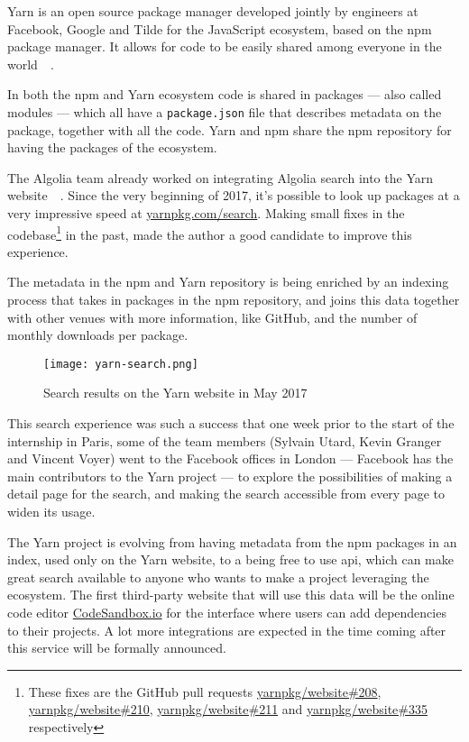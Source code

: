 Yarn is an open source package manager developed jointly by engineers at Facebook, Google and Tilde for the JavaScript ecosystem, based on the npm package manager. It allows for code to be easily shared among everyone in the world~\cite{yarn-site}~.

In both the npm and Yarn ecosystem code is shared in packages --- also called modules --- which all have a {\tt package.json} file that describes metadata on the package, together with all the code. Yarn and npm share the npm repository for having the packages of the ecosystem.

The Algolia team already worked on integrating Algolia search into the Yarn website~\cite{yarn-pr-add-algolia}~. Since the very beginning of 2017, it's possible to look up packages at a very impressive speed at \href{https://yarnpkg.com/search}{yarnpkg.com/search}. Making small fixes in the codebase\footnote{These fixes are the GitHub pull requests \href{https://github.com/yarnpkg/website/pulls/208}{yarnpkg/website\#208}, \href{https://github.com/yarnpkg/website/pulls/210}{yarnpkg/website\#210}, \href{https://github.com/yarnpkg/website/pulls211}{yarnpkg/website\#211} and \href{https://github.com/yarnpkg/website/pulls/335}{yarnpkg/website\#335} respectively} in the past, made the author a good candidate to improve this experience.

The metadata in the npm and Yarn repository is being enriched by an indexing process\cite{npm-search} that takes in packages in the npm repository, and joins this data together with other venues with more information, like GitHub, and the number of monthly downloads per package.

\begin{figure}[H]
  \centering
  \texttt{[image: yarn-search.png]}
  \caption{Search results on the Yarn website in May 2017}
  \label{figure:yarn-search}
\end{figure}

This search experience was such a success that one week prior to the start of the internship in Paris, some of the team members (Sylvain Utard, Kevin Granger and Vincent Voyer) went to the Facebook offices in London --- Facebook has the main contributors to the Yarn project --- to explore the possibilities of making a detail page for the search, and making the search accessible from every page to widen its usage.

The Yarn project is evolving from having metadata from the npm packages in an index, used only on the Yarn website, to a being free to use \acrshort{api}, which can make great search available to anyone who wants to make a project leveraging the ecosystem. The first third-party website that will use this data will be the online code editor \href{https://codesandbox.io}{CodeSandbox.io} for the interface where users can add dependencies to their projects. A lot more integrations are expected in the time coming after this service will be formally announced.

